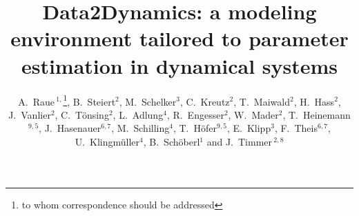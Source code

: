 \documentclass{bioinfo}
\begin{document}

\title[Data2Dynamics]{Data2Dynamics: a modeling environment tailored to parameter 
estimation in dynamical systems}
\author[A.~Raue \textit{et~al.}]{
A.~Raue\,$^{1,}$\footnote{to whom correspondence 
should be addressed}, 
B.~Steiert$^{2}$, 
M.~Schelker$^{3}$, 
C.~Kreutz$^{2}$, 
T.~Maiwald$^{2}$, 
H.~Hass$^{2}$, 
J.~Vanlier$^{2}$, 
C.~T\"onsing$^{2}$, 
L.~Adlung$^{4}$, 
R.~Engesser$^{2}$, 
W.~Mader$^{2}$, 
T.~Heinemann$^{9,5}$, 
J.~Hasenauer$^{6,7}$, 
M.~Schilling$^{4}$, 
T.~H\"ofer$^{9,5}$, 
E.~Klipp$^{3}$, 
F.~Theis$^{6,7}$, 
U.~Klingm\"uller$^{4}$,
B.~Sch\"oberl$^{1}$ 
and J.~Timmer\,$^{2,8}$}
\address{$^{1}$Merrimack Pharmaceuticals Inc., 02139 Cambridge, MA, USA\\
$^{2}$University of Freiburg, Institute for Physics, 79104 Freiburg, Germany\\
$^{3}$Humboldt-Universit\"at zu Berlin, Theoretical Biophysics, 10115 Berlin, Germany\\
$^{4}$Systems Biology of Signal Transduction, German Cancer Research Center, 69120 Heidelberg, Germany\\
$^{5}$BioQuant, University of Heidelberg, 69120 Heidelberg, Germany\\
$^{6}$Helmholtz Center Munich, 85764 Neuherberg, Germany\\
$^{7}$Technische Universit\"at M\"unchen, 85748 Garching, Germany \\
$^{8}$BIOSS Centre for Biological Signalling Studies, University of Freiburg, 79104 Freiburg, Germany\\
$^{9}$Divison of Theoretical Systems Biology, German Cancer Research Center, 69120 Heidelberg, Germany}



\maketitle
\end{document}
